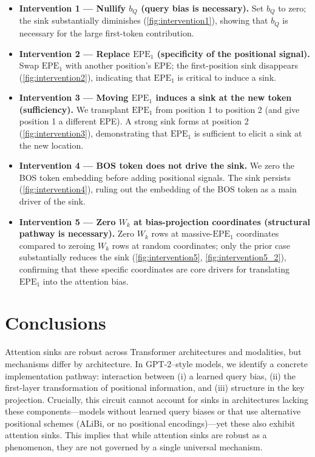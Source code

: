 \documentclass[11pt]{article}
\begin{document}
\begin{itemize}[leftmargin=*]
  \item \textbf{Intervention 1 — Nullify $b_Q$ (query bias is necessary).} Set $b_Q$ to zero; the sink substantially diminishes (\cref{fig:intervention1}), showing that $b_Q$ is necessary for the large first-token contribution.
  \item \textbf{Intervention 2 — Replace $\mathrm{EPE}_1$ (specificity of the positional signal).} Swap $\mathrm{EPE}_1$ with another position’s EPE; the first-position sink disappears (\cref{fig:intervention2}), indicating that $\mathrm{EPE}_1$ is critical to induce a sink.
  \item \textbf{Intervention 3 — Moving $\mathrm{EPE}_1$ induces a sink at the new token (sufficiency).} We transplant $\mathrm{EPE}_1$ from position 1 to position 2 (and give position 1 a different EPE). A strong sink forms at position 2 (\cref{fig:intervention3}), demonstrating that $\mathrm{EPE}_1$ is sufficient to elicit a sink at the new location.
  \item \textbf{Intervention 4 — BOS token does not drive the sink.} We zero the BOS token embedding before adding positional signals. The sink persists (\cref{fig:intervention4}), ruling out the embedding of the BOS token as a main driver of the sink.
  \item \textbf{Intervention 5 — Zero $W_k$ at bias-projection coordinates (structural pathway is necessary).} Zero $W_k$ rows at massive-$\mathrm{EPE}_1$ coordinates compared to zeroing $W_k$ rows at random coordinates; only the prior case substantially reduces the sink (\cref{fig:intervention5}, \cref{fig:intervention5_2}), confirming that these specific coordinates are core drivers for translating $\mathrm{EPE}_1$ into the attention bias.
\end{itemize}

\section{Conclusions}
Attention sinks are robust across Transformer architectures and modalities, but mechanisms differ by architecture. In GPT-2–style models, we identify a concrete implementation pathway: interaction between  (i) a learned query bias, (ii) the 
first-layer transformation of positional information, and (iii) structure 
in the key projection. Crucially, this circuit cannot account for sinks in architectures lacking these components—models without learned query biases or that use alternative positional schemes (ALiBi, or no positional encodings)—yet these also exhibit attention sinks. This implies that while attention sinks are robust as a phenomenon, they are not governed by a single universal mechanism.
\end{document}
